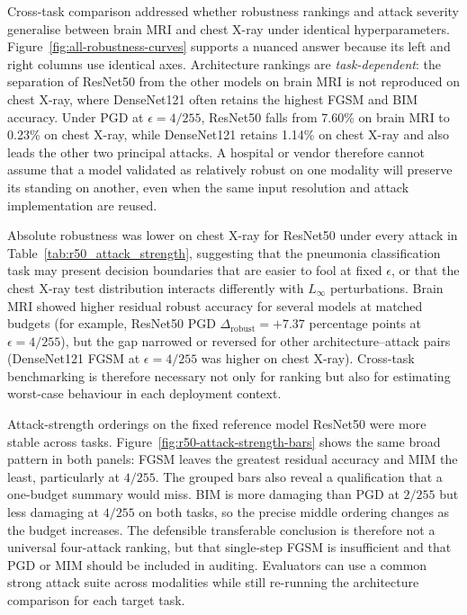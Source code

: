 \documentclass[12pt,a4paper,oneside]{report}
\begin{document}
Cross-task comparison addressed whether robustness rankings and attack severity generalise between brain MRI and chest X-ray under identical hyperparameters. Figure~\ref{fig:all-robustness-curves} supports a nuanced answer because its left and right columns use identical axes. Architecture rankings are \emph{task-dependent}: the separation of ResNet50 from the other models on brain MRI is not reproduced on chest X-ray, where DenseNet121 often retains the highest FGSM and BIM accuracy. Under PGD at $\epsilon = 4/255$, ResNet50 falls from 7.60\% on brain MRI to 0.23\% on chest X-ray, while DenseNet121 retains 1.14\% on chest X-ray and also leads the other two principal attacks. A hospital or vendor therefore cannot assume that a model validated as relatively robust on one modality will preserve its standing on another, even when the same input resolution and attack implementation are reused.

Absolute robustness was lower on chest X-ray for ResNet50 under every attack in Table~\ref{tab:r50_attack_strength}, suggesting that the pneumonia classification task may present decision boundaries that are easier to fool at fixed $\epsilon$, or that the chest X-ray test distribution interacts differently with $L_\infty$ perturbations. Brain MRI showed higher residual robust accuracy for several models at matched budgets (for example, ResNet50 PGD $\Delta_{\mathrm{robust}} = +7.37$ percentage points at $\epsilon = 4/255$), but the gap narrowed or reversed for other architecture--attack pairs (DenseNet121 FGSM at $\epsilon = 4/255$ was higher on chest X-ray). Cross-task benchmarking is therefore necessary not only for ranking but also for estimating worst-case behaviour in each deployment context.

Attack-strength orderings on the fixed reference model ResNet50 were more stable across tasks. Figure~\ref{fig:r50-attack-strength-bars} shows the same broad pattern in both panels: FGSM leaves the greatest residual accuracy and MIM the least, particularly at $4/255$. The grouped bars also reveal a qualification that a one-budget summary would miss. BIM is more damaging than PGD at $2/255$ but less damaging at $4/255$ on both tasks, so the precise middle ordering changes as the budget increases. The defensible transferable conclusion is therefore not a universal four-attack ranking, but that single-step FGSM is insufficient and that PGD or MIM should be included in auditing. Evaluators can use a common strong attack suite across modalities while still re-running the architecture comparison for each target task.
\end{document}
